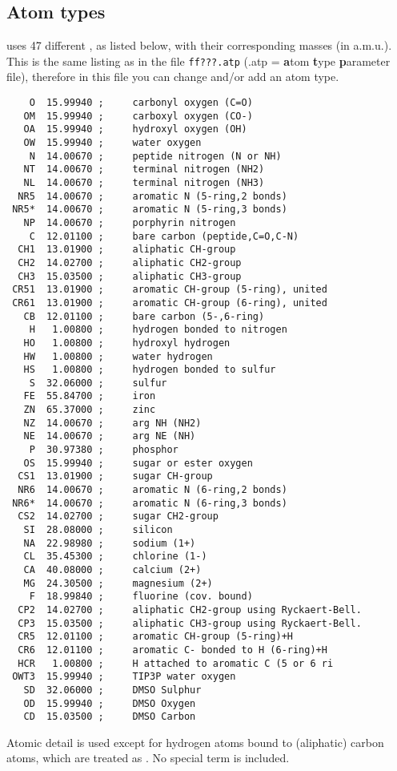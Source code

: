 \subsection{Atom types}
\label{subsec:atomtype}
{\gromacs} uses 47 different , 
as listed below, with their
corresponding masses (in a.m.u.). This is the same listing as in the
file {\tt ff???.atp} (.atp = {\bf a}tom {\bf t}ype {\bf p}arameter
file), therefore in this file you can change and/or add an atom type.
{\small\begin{verbatim}
    O  15.99940 ;     carbonyl oxygen (C=O)
   OM  15.99940 ;     carboxyl oxygen (CO-)
   OA  15.99940 ;     hydroxyl oxygen (OH)
   OW  15.99940 ;     water oxygen
    N  14.00670 ;     peptide nitrogen (N or NH)
   NT  14.00670 ;     terminal nitrogen (NH2)
   NL  14.00670 ;     terminal nitrogen (NH3)
  NR5  14.00670 ;     aromatic N (5-ring,2 bonds)
 NR5*  14.00670 ;     aromatic N (5-ring,3 bonds)
   NP  14.00670 ;     porphyrin nitrogen
    C  12.01100 ;     bare carbon (peptide,C=O,C-N)
  CH1  13.01900 ;     aliphatic CH-group
  CH2  14.02700 ;     aliphatic CH2-group
  CH3  15.03500 ;     aliphatic CH3-group
 CR51  13.01900 ;     aromatic CH-group (5-ring), united
 CR61  13.01900 ;     aromatic CH-group (6-ring), united
   CB  12.01100 ;     bare carbon (5-,6-ring)
    H   1.00800 ;     hydrogen bonded to nitrogen
   HO   1.00800 ;     hydroxyl hydrogen
   HW   1.00800 ;     water hydrogen
   HS   1.00800 ;     hydrogen bonded to sulfur
    S  32.06000 ;     sulfur
   FE  55.84700 ;     iron
   ZN  65.37000 ;     zinc
   NZ  14.00670 ;     arg NH (NH2)
   NE  14.00670 ;     arg NE (NH)
    P  30.97380 ;     phosphor
   OS  15.99940 ;     sugar or ester oxygen
  CS1  13.01900 ;     sugar CH-group
  NR6  14.00670 ;     aromatic N (6-ring,2 bonds)
 NR6*  14.00670 ;     aromatic N (6-ring,3 bonds)
  CS2  14.02700 ;     sugar CH2-group
   SI  28.08000 ;     silicon
   NA  22.98980 ;     sodium (1+)
   CL  35.45300 ;     chlorine (1-)
   CA  40.08000 ;     calcium (2+)
   MG  24.30500 ;     magnesium (2+)
    F  18.99840 ;     fluorine (cov. bound)
  CP2  14.02700 ;     aliphatic CH2-group using Ryckaert-Bell.
  CP3  15.03500 ;     aliphatic CH3-group using Ryckaert-Bell.
  CR5  12.01100 ;     aromatic CH-group (5-ring)+H
  CR6  12.01100 ;     aromatic C- bonded to H (6-ring)+H
  HCR   1.00800 ;     H attached to aromatic C (5 or 6 ri
 OWT3  15.99940 ;     TIP3P water oxygen
   SD  32.06000 ;     DMSO Sulphur
   OD  15.99940 ;     DMSO Oxygen
   CD  15.03500 ;     DMSO Carbon
\end{verbatim}}
Atomic detail is used except for hydrogen atoms bound to (aliphatic)
carbon atoms, which are treated as {\em {}}. No
special  term is included.


